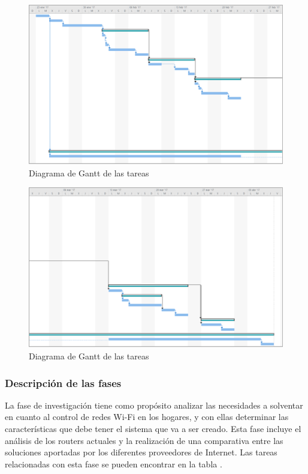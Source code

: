 \documentclass[12pt]{article}
\begin{document}
        \begin{figure}[h!]
            \centering
                \includegraphics[scale=0.5]{tasks_gantt0.eps}
                \caption{Diagrama de Gantt de las tareas}
                \label{fig:tasks_gantt0}
        \end{figure}

        \begin{figure}[h!]
            \centering
                \includegraphics[scale=0.5]{tasks_gantt1.eps}
                \caption{Diagrama de Gantt de las tareas}
                \label{fig:tasks_gantt1}
        \end{figure}

        \clearpage

        \subsubsection{Descripción de las fases}
            La fase de investigación tiene como propósito analizar las necesidades a solventar en cuanto al control de redes Wi-Fi en los hogares, y con ellas determinar las características que debe tener el sistema que va a ser creado. Esta fase incluye el análisis de los routers actuales y la realización de una comparativa entre las soluciones aportadas por los diferentes proveedores de Internet. Las tareas relacionadas con esta fase se pueden encontrar en la tabla .
\end{document}
